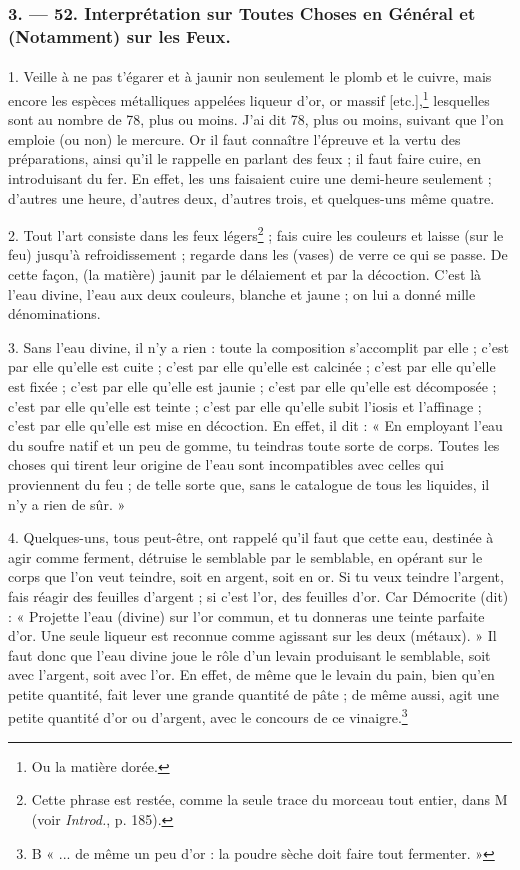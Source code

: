 \documentclass[a4paper, 11pt, oneside, polutonikogreek, french]{article}
\begin{document}
\subsubsection{3. --- 52. Interprétation sur Toutes Choses en Général et (Notamment) sur les Feux.}
\paragraph{}
1. Veille à ne pas t'égarer et à jaunir non seulement le plomb et le cuivre, mais encore les espèces métalliques appelées liqueur d'or, or massif [etc.],\footnote{Ou la matière dorée.} lesquelles sont au nombre de 78, plus ou moins. J'ai dit 78, plus ou moins, suivant que l'on emploie (ou non) le mercure. Or il faut connaître l'épreuve et la vertu des préparations, ainsi qu'il le rappelle en parlant des feux ; il faut faire cuire, en introduisant du fer. En effet, les uns faisaient cuire une demi-heure seulement ; d'autres une heure, d'autres deux, d'autres trois, et quelques-uns même quatre.

2. Tout l'art consiste dans les feux légers\footnote{Cette phrase est restée, comme la seule trace du morceau tout entier, dans M (voir \emph{Introd.}, p. 185).} ; fais cuire les couleurs et laisse (sur le feu) jusqu'à refroidissement ; regarde dans les (vases) de verre ce qui se passe. De cette façon, (la matière) jaunit par le délaiement et par la décoction. C'est là l'eau divine, l'eau aux deux couleurs, blanche et jaune ; on lui a donné mille dénominations.

3. Sans l'eau divine, il n'y a rien : toute la composition s'accomplit par elle ; c'est par elle qu'elle est cuite ; c'est par elle qu'elle est calcinée ; c'est par elle qu'elle est fixée ; c'est par elle qu'elle est jaunie ; c'est par elle qu'elle est décomposée ; c'est par elle qu'elle est teinte ; c'est par elle qu'elle subit l'iosis et l'affinage ; c'est par elle qu'elle est mise en décoction. En effet, il dit : « En employant l'eau du soufre natif et un peu de gomme, tu teindras toute sorte de corps. Toutes les choses qui tirent leur origine de l'eau sont incompatibles avec celles qui proviennent du feu ; de telle sorte que, sans le catalogue de tous les liquides, il n'y a rien de sûr. »

4. Quelques-uns, tous peut-être, ont rappelé qu'il faut que cette eau, destinée à agir comme ferment, détruise le semblable par le semblable, en opérant sur le corps que l'on veut teindre, soit en argent, soit en or. Si tu veux teindre l'argent, fais réagir des feuilles d'argent ; si c'est l'or, des feuilles d'or. Car Démocrite (dit) : « Projette l'eau (divine) sur l'or commun, et tu donneras une teinte parfaite d'or. Une seule liqueur est reconnue comme agissant sur les deux (métaux). » Il faut donc que l'eau divine joue le rôle d'un levain produisant le semblable, soit avec l'argent, soit avec l'or. En effet, de même que le levain du pain, bien qu'en petite quantité, fait lever une grande quantité de pâte ; de même aussi, agit une petite quantité d'or ou d'argent, avec le concours de ce vinaigre.\footnote{B « ... de même un peu d'or : la poudre sèche doit faire tout fermenter. »}
\end{document}
